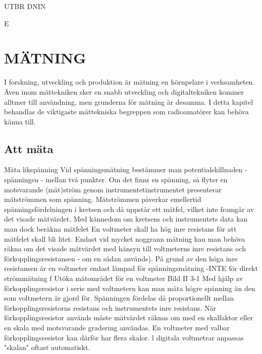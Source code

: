 \documentclass[a4paper,twoside,twocolumn,openright]{book}
\begin{document}
{{{{{UTBR DNIN

E

\chapter{MÄTNING}

I forskning, utveckling och produktion är mätning en hörnpelare i verksamheten. Även
inom mättekniken sker en snabb utveckling och digitaltekniken kommer alltmer till
användning, men grunderna för mätning är desamma. I detta kapitel behandlas de viktigaste
mättekniska begreppen som radioamatörer kan behöva känna till.

\section{Att mäta}

Mäta likspänning
Vid spänningsmätning bestämmer man potentialskillnaden -spänningen - mellan två
punkter. Om det finns en spänning, så flyter
en motsvarande (mät)ström genom instrumentetinstrumentet presenterar mätströmmen som spänning.
Mätströmmen påverkar emellertid spänningsfördelningen i kretsen och då uppstår
ett mätfel, vilket inte framgår av det visade
mätvärdet. Med kännedom om kretsens och
instrumentets data kan man dock beräkna
mätfelet En voltmeter skall ha hög inre
resistans för att mätfelet skall bli litet.
Endast vid mycket noggrann mätning
kan man behöva räkna om det visade mätvärdet med hänsyn till voltmeterns inre resistans och förkopplingsresistansen - om
en sådan används).
På grund av den höga inre resistansen är
en voltmeter endast lämpad för spänningsmätning -INTE för direkt strömmätning f
Utöka mätområdet för en voltmeter
Bild II 3-1
Med hjälp av förkopplingsresistor i serie
med voltmetern kan man mäta högre spänning än den som voltmetern är gjord för.
Spänningen fördelas då proportionellt mellan förkopplingsresistorns resistans och instrumentets inre resistans.
När förkopplingsresistor används måste
mätvärdet räknas om med en skalfaktor eller
en skala med motsvarande gradering användas. En voltmeter med valbar förkopplingsresistor kan därför har flera skalor. l
digitala voltmetrar anpassas "skalan" oftast
automatiskt.

}}}}}
\end{document}
